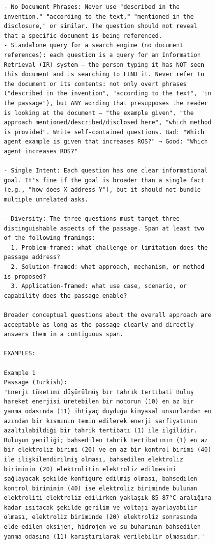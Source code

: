 \begin{figure}[h!]
\begin{minipage}{0.95\textwidth}
\begin{Verbatim}[breaklines=true, breakanywhere=true]
- No Document Phrases: Never use "described in the invention," "according to the text," "mentioned in the disclosure," or similar. The question should not reveal that a specific document is being referenced.
- Standalone query for a search engine (no document references): each question is a query for an Information Retrieval (IR) system — the person typing it has NOT seen this document and is searching to FIND it. Never refer to the document or its contents: not only overt phrases ("described in the invention", "according to the text", "in the passage"), but ANY wording that presupposes the reader is looking at the document — "the example given", "the approach mentioned/described/disclosed here", "which method is provided". Write self-contained questions. Bad: "Which agent example is given that increases ROS?" → Good: "Which agent increases ROS?"

- Single Intent: Each question has one clear informational goal. It's fine if the goal is broader than a single fact (e.g., "how does X address Y"), but it should not bundle multiple unrelated asks.

- Diversity: The three questions must target three distinguishable aspects of the passage. Span at least two of the following framings:
  1. Problem-framed: what challenge or limitation does the passage address?
  2. Solution-framed: what approach, mechanism, or method is proposed?
  3. Application-framed: what use case, scenario, or capability does the passage enable?

Broader conceptual questions about the overall approach are acceptable as long as the passage clearly and directly answers them in a contiguous span.

EXAMPLES:

Example 1
Passage (Turkish):
"Enerji̇ tüketi̇mi̇ düşürülmüş bi̇r tahri̇k terti̇bati Buluş hareket enerjisi üretebilen bir motorun (10) en az bir yanma odasında (11) ihtiyaç duyduğu kimyasal unsurlardan en azından bir kısmının temin edilerek enerji sarfiyatının azaltılabildiği bir tahrik tertibatı (1) ile ilgilidir. Buluşun yeniliği; bahsedilen tahrik tertibatının (1) en az bir elektroliz birimi (20) ve en az bir kontrol birimi (40) ile ilişkilendirilmiş olması, bahsedilen elektroliz biriminin (20) elektrolitin elektroliz edilmesini sağlayacak şekilde konfigüre edilmiş olması, bahsedilen kontrol biriminin (40) ise elektroliz biriminde bulunan elektroliti elektroliz edilirken yaklaşık 85-87°C aralığına kadar ısıtacak şekilde gerilim ve voltajı ayarlayabilir olması, elektroliz biriminde (20) elektroliz sonrasında elde edilen oksijen, hidrojen ve su buharının bahsedilen yanma odasına (11) karıştırılarak verilebilir olmasıdır."


\end{Verbatim}
\end{minipage}
\end{figure}
